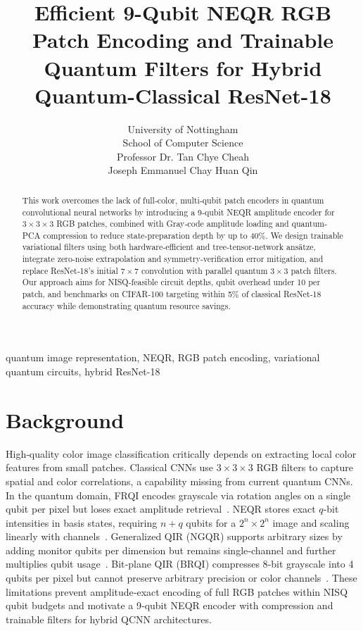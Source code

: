 \documentclass[onecolumn,12pt]{IEEEtran}
\begin{document}
\title{Efficient 9-Qubit NEQR RGB Patch Encoding and Trainable Quantum Filters for Hybrid Quantum-Classical ResNet-18}
\author{
University of Nottingham\\
School of Computer Science\\
\small{Professor Dr. Tan Chye Cheah}\\
\small{Joseph Emmanuel Chay Huan Qin}
}
\maketitle

\begin{abstract}
This work overcomes the lack of full‐color, multi‐qubit patch encoders in quantum convolutional neural networks by introducing a 9‐qubit NEQR amplitude encoder for $3\times3\times3$ RGB patches, combined with Gray‐code amplitude loading and quantum‐PCA compression to reduce state‐preparation depth by up to 40\%. We design trainable variational filters using both hardware‐efficient and tree‐tensor‐network ansätze, integrate zero‐noise extrapolation and symmetry‐verification error mitigation, and replace ResNet‐18’s initial $7\times7$ convolution with parallel quantum $3\times3$ patch filters. Our approach aims for NISQ‐feasible circuit depths, qubit overhead under 10 per patch, and benchmarks on CIFAR‐100 targeting within 5\% of classical ResNet‐18 accuracy while demonstrating quantum resource savings.
\end{abstract}

\begin{IEEEkeywords}
quantum image representation, NEQR, RGB patch encoding, variational quantum circuits, hybrid ResNet-18
\end{IEEEkeywords}

\section{Background}
High‐quality color image classification critically depends on extracting local color features from small patches. Classical CNNs use $3\times3\times3$ RGB filters to capture spatial and color correlations, a capability missing from current quantum CNNs. In the quantum domain, FRQI encodes grayscale via rotation angles on a single qubit per pixel but loses exact amplitude retrieval~\cite{le2011frqi}. NEQR stores exact $q$‐bit intensities in basis states, requiring $n+q$ qubits for a $2^n\times2^n$ image and scaling linearly with channels~\cite{zhang2013neqr}. Generalized QIR (NGQR) supports arbitrary sizes by adding monitor qubits per dimension but remains single‐channel and further multiplies qubit usage~\cite{xing2024ngqr}. Bit‐plane QIR (BRQI) compresses 8‐bit grayscale into 4 qubits per pixel but cannot preserve arbitrary precision or color channels~\cite{li2018bitplane}. These limitations prevent amplitude‐exact encoding of full RGB patches within NISQ qubit budgets and motivate a 9‐qubit NEQR encoder with compression and trainable filters for hybrid QCNN architectures.
\end{document}

